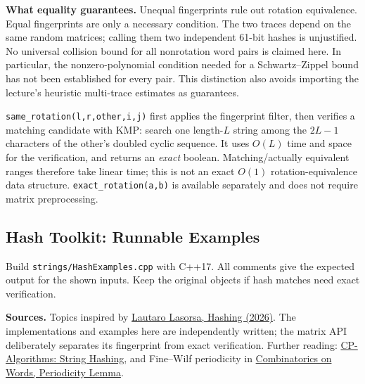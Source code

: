 \textbf{What equality guarantees.} Unequal fingerprints rule out
rotation equivalence. Equal fingerprints are only a necessary
condition. The two traces depend on the same random matrices;
calling them two independent 61-bit hashes is unjustified.
No universal collision bound for all nonrotation word pairs is
claimed here. In particular, the nonzero-polynomial condition needed
for a Schwartz--Zippel bound has not been established for every pair.
This distinction also avoids importing the lecture's heuristic
multi-trace estimates as guarantees.

\texttt{same\_rotation(l,r,other,i,j)} first applies the fingerprint
filter, then verifies a matching candidate with KMP: search one
length-$L$ string among the $2L-1$ characters of the other's doubled
cyclic sequence. It uses $O(L)$ time and space for the verification,
and returns an \emph{exact} boolean. Matching/actually equivalent
ranges therefore take linear time; this is not an exact $O(1)$
rotation-equivalence data structure. \texttt{exact\_rotation(a,b)}
is available separately and does not require matrix preprocessing.


\subsection{Hash Toolkit: Runnable Examples}
Build \texttt{strings/HashExamples.cpp} with C++17.
All comments give the expected output for the shown inputs.
Keep the original objects if hash matches need exact verification.


\begin{minipage}{\linewidth}
\textbf{Sources.} Topics inspired by
\href{https://aapc.org.ar/wp-content/uploads/2026/07/2026-07-27-lautaro-lasorsa-hashing.pdf}{Lautaro Lasorsa, Hashing (2026)}.
The implementations and examples here are independently written;
the matrix API deliberately separates its fingerprint from exact
verification. Further reading:
\href{https://cp-algorithms.com/string/string-hashing.html}{CP-Algorithms:
String Hashing}, and Fine--Wilf periodicity in
\href{https://www.isa-afp.org/browser_info/current/AFP/Combinatorics_Words/outline.pdf}{Combinatorics
on Words, Periodicity Lemma}.
\par
\end{minipage}
\par
\endgroup
